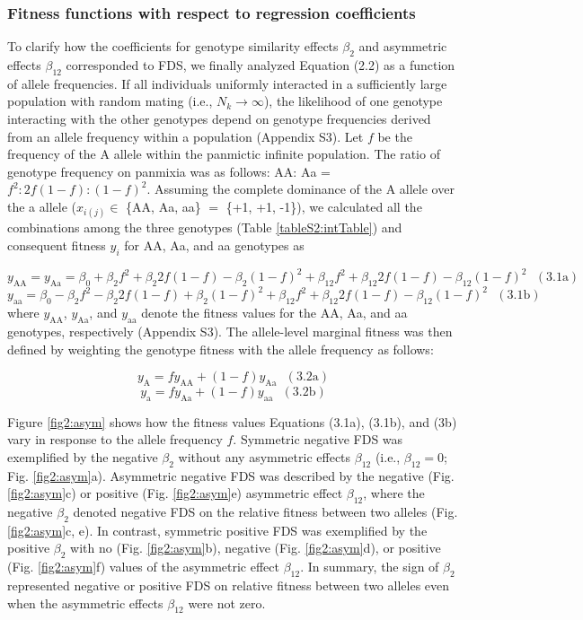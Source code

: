 \documentclass[12pt,]{article}
\begin{document}
\subsubsection{Fitness functions with respect to regression coefficients}
To clarify how the coefficients for genotype similarity effects $\beta_2$ and asymmetric effects $\beta_{12}$ corresponded to FDS, we finally analyzed Equation (2.2) as a function of allele frequencies. If all individuals uniformly interacted in a sufficiently large population with random mating (i.e., $N_k \to \infty$), the likelihood of one genotype interacting with the other genotypes depend on genotype frequencies derived from an allele frequency within a population (Appendix S3). Let $f$ be the frequency of the A allele within the panmictic infinite population. The ratio of genotype frequency on panmixia was as follows: AA: Aa = $f^2:2f(1-f):(1-f)^2$. Assuming the complete dominance of the A allele over the a allele ($x_{i(j)} \in$ \{AA, Aa, aa\} $=$ \{+1, +1, -1\}), we calculated all the combinations among the three genotypes (Table \ref{tableS2:intTable}) and consequent fitness $y_i$ for AA, Aa, and aa genotypes as

$$y_\mathrm{AA} = y_\mathrm{Aa} = \beta_0 + \beta_2 f^2 + \beta_2 2f(1-f) - \beta_2(1-f)^2 + \beta_{12}f^2 + \beta_{12}2f(1-f) - \beta_{12}(1-f)^2~~~\mathrm{(3.1a)}$$
$$y_\mathrm{aa} = \beta_0 - \beta_2 f^2 - \beta_2 2f(1-f) + \beta_2(1-f)^2 + \beta_{12}f^2 + \beta_{12}2f(1-f) - \beta_{12}(1-f)^2~~~\mathrm{(3.1b)}$$
where $y_\mathrm{AA}$, $y_\mathrm{Aa}$, and $y_\mathrm{aa}$ denote the fitness values for the AA, Aa, and aa genotypes, respectively (Appendix S3). The allele-level marginal fitness was then defined by weighting the genotype fitness with the allele frequency as follows:

$$y_\mathrm{A} = f y_\mathrm{AA} + (1 - f) y_\mathrm{Aa}~~~\mathrm{(3.2a)}$$
$$y_\mathrm{a} = f y_\mathrm{Aa} + (1 - f) y_\mathrm{aa}~~~\mathrm{(3.2b)}$$

Figure \ref{fig2:asym} shows how the fitness values Equations (3.1a), (3.1b), and (3b) vary in response to the allele frequency $f$. Symmetric negative FDS was exemplified by the negative $\beta_2$ without any asymmetric effects $\beta_{12}$ (i.e., $\beta_{12}=0$; Fig. \ref{fig2:asym}a). Asymmetric negative FDS was described by the negative (Fig. \ref{fig2:asym}c) or positive (Fig. \ref{fig2:asym}e) asymmetric effect $\beta_{12}$, where the negative $\beta_2$ denoted negative FDS on the relative fitness between two alleles (Fig. \ref{fig2:asym}c, e). In contrast, symmetric positive FDS was exemplified by the positive $\beta_2$ with no (Fig. \ref{fig2:asym}b), negative (Fig. \ref{fig2:asym}d), or positive (Fig. \ref{fig2:asym}f) values of the asymmetric effect $\beta_{12}$. In summary, the sign of $\beta_2$ represented negative or positive FDS on relative fitness between two alleles even when the asymmetric effects $\beta_{12}$ were not zero.
\end{document}
